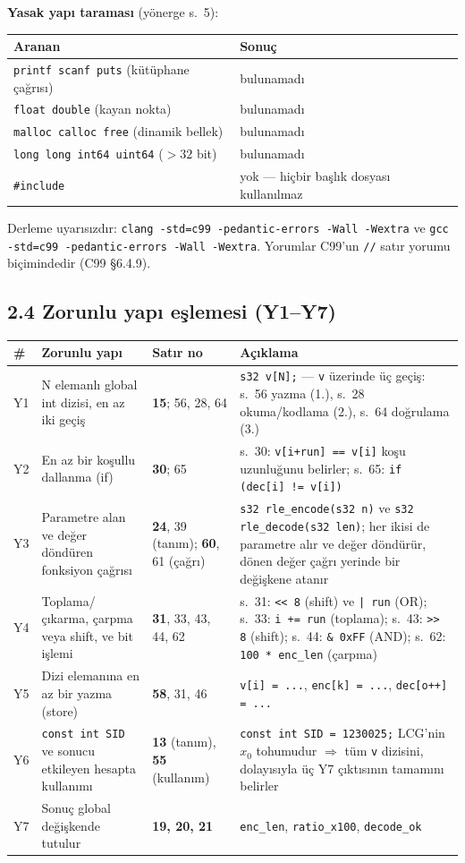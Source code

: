\documentclass[11pt,a4paper]{article}
\newcommand{\tl}{\texttt}
\begin{document}
\textbf{Yasak yapı taraması} (yönerge s.~5):

\begin{longtable}{p{7.0cm}p{8.0cm}}
\toprule
\textbf{Aranan} & \textbf{Sonuç}\\
\midrule
\tl{printf scanf puts} (kütüphane çağrısı) & bulunamadı\\
\tl{float double} (kayan nokta)            & bulunamadı\\
\tl{malloc calloc free} (dinamik bellek)   & bulunamadı\\
\tl{long long int64 uint64} ($>32$ bit)    & bulunamadı\\
\tl{\#include}                             & yok --- hiçbir başlık dosyası kullanılmaz\\
\bottomrule
\end{longtable}

Derleme uyarısızdır: \tl{clang -std=c99 -pedantic-errors -Wall -Wextra} ve
\tl{gcc -std=c99 -pedantic-errors -Wall -Wextra}. Yorumlar C99'un \tl{//} satır yorumu
biçimindedir (C99 §6.4.9).

\subsection*{2.4 Zorunlu yapı eşlemesi (Y1--Y7)}

\begin{longtable}{p{0.7cm}p{4.2cm}p{2.0cm}p{7.6cm}}
\toprule
\textbf{\#} & \textbf{Zorunlu yapı} & \textbf{Satır no} & \textbf{Açıklama}\\
\midrule
\endhead
Y1 & N elemanlı global int dizisi, en az iki geçiş & \textbf{15}; 56, 28, 64 & \tl{s32 v[N];} --- \tl{v} üzerinde üç geçiş: s.~56 yazma (1.), s.~28 okuma/kodlama (2.), s.~64 doğrulama (3.)\\
Y2 & En az bir koşullu dallanma (if) & \textbf{30}; 65 & s.~30: \tl{v[i+run] == v[i]} koşu uzunluğunu belirler; s.~65: \tl{if (dec[i] != v[i])}\\
Y3 & Parametre alan ve değer döndüren fonksiyon çağrısı & \textbf{24}, 39 (tanım); \textbf{60}, 61 (çağrı) & \tl{s32 rle\_encode(s32 n)} ve \tl{s32 rle\_decode(s32 len)}; her ikisi de parametre alır ve değer döndürür, dönen değer çağrı yerinde bir değişkene atanır\\
Y4 & Toplama/çıkarma, çarpma veya shift, ve bit işlemi & \textbf{31}, 33, 43, 44, 62 & s.~31: \tl{<< 8} (shift) ve \tl{| run} (OR); s.~33: \tl{i += run} (toplama); s.~43: \tl{>> 8} (shift); s.~44: \tl{\& 0xFF} (AND); s.~62: \tl{100 * enc\_len} (çarpma)\\
Y5 & Dizi elemanına en az bir yazma (store) & \textbf{58}, 31, 46 & \tl{v[i] = ...}, \tl{enc[k] = ...}, \tl{dec[o++] = ...}\\
Y6 & \tl{const int SID} ve sonucu etkileyen hesapta kullanımı & \textbf{13} (tanım), \textbf{55} (kullanım) & \tl{const int SID = 1230025;} LCG'nin $x_0$ tohumudur $\Rightarrow$ tüm \tl{v} dizisini, dolayısıyla üç Y7 çıktısının tamamını belirler\\
Y7 & Sonuç global değişkende tutulur & \textbf{19, 20, 21} & \tl{enc\_len}, \tl{ratio\_x100}, \tl{decode\_ok}\\
\bottomrule
\end{longtable}
\end{document}
